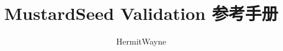 \documentclass[a4paper]{article}
\begin{document}
\begin{CJK*}{UTF8}{song}

\title{MustardSeed Validation 参考手册}
\author{HermitWayne}
\date{}
\maketitle






\end{CJK*}
\end{document}

